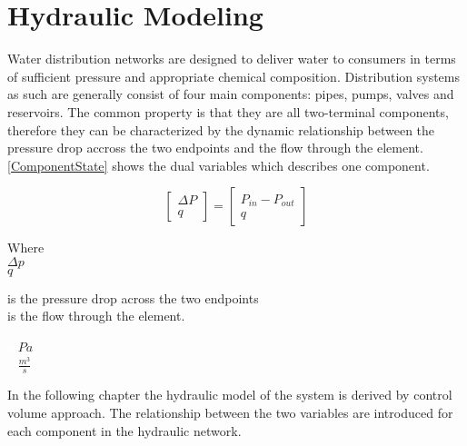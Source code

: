 \section{Hydraulic Modeling}
\label{HydraulicModel}

Water distribution networks are designed to deliver water to consumers in terms of sufficient pressure and appropriate chemical composition. Distribution systems as such are generally consist of four main components: pipes, pumps, valves and reservoirs. The common property is that they are all two-terminal components, therefore they can be characterized by the dynamic relationship between the pressure drop accross the two endpoints and the flow through the element\cite{Kallesoe2009}.  \eqref{ComponentState} shows the dual variables which describes one component. 

\begin{equation}
\label{ComponentState}
 \begin{bmatrix}
    \Delta P \\
    q
\end{bmatrix}
=
 \begin{bmatrix}
    P_{in} - P_{out} \\
    q
\end{bmatrix}
\end{equation}

 \begin{minipage}[t]{0.20\textwidth}
Where\\
\hspace*{8mm} $\Delta p$ \\
\hspace*{8mm} $q$ 
\end{minipage}
\begin{minipage}[t]{0.68\textwidth}
\vspace*{2mm}
is the pressure drop across the two endpoints\\
is the flow through the element.
\end{minipage}
\begin{minipage}[t]{0.10\textwidth}
\vspace*{2mm}
\textcolor{White}{te}$\unit{Pa}$\\
\textcolor{White}{te}$\unit{\frac{m^{3}}{s}}$
\end{minipage}

In the following chapter the hydraulic model of the system is derived by control volume approach\cite{Hunt_Fluidmechanics}. The relationship between the two variables are introduced for each component in the hydraulic network.

